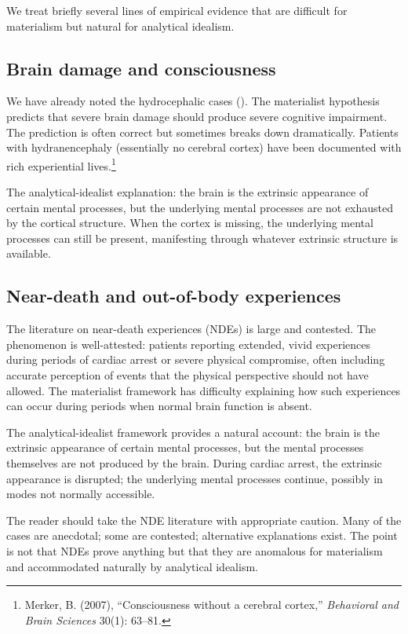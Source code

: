 We treat briefly several lines of empirical evidence that are
difficult for materialism but natural for analytical idealism.

\subsection{Brain damage and consciousness}

We have already noted the hydrocephalic cases ().
The materialist hypothesis predicts that severe brain damage should
produce severe cognitive impairment. The prediction is often correct
but sometimes breaks down dramatically. Patients with
hydranencephaly (essentially no cerebral cortex) have been
documented with rich experiential lives.\footnote{Merker, B.
(2007), ``Consciousness without a cerebral cortex,'' \emph{Behavioral
and Brain Sciences} 30(1): 63--81.}

The analytical-idealist explanation: the brain is the extrinsic
appearance of certain mental processes, but the underlying mental
processes are not exhausted by the cortical structure. When the
cortex is missing, the underlying mental processes can still be
present, manifesting through whatever extrinsic structure is
available.

\subsection{Near-death and out-of-body experiences}

The literature on near-death experiences (NDEs) is large and
contested. The phenomenon is well-attested: patients reporting
extended, vivid experiences during periods of cardiac arrest or
severe physical compromise, often including accurate perception of
events that the physical perspective should not have allowed. The
materialist framework has difficulty explaining how such
experiences can occur during periods when normal brain function is
absent.

The analytical-idealist framework provides a natural account: the
brain is the extrinsic appearance of certain mental processes, but
the mental processes themselves are not produced by the brain.
During cardiac arrest, the extrinsic appearance is disrupted; the
underlying mental processes continue, possibly in modes not normally
accessible.

The reader should take the NDE literature with appropriate caution.
Many of the cases are anecdotal; some are contested; alternative
explanations exist. The point is not that NDEs prove anything but
that they are anomalous for materialism and accommodated naturally
by analytical idealism.

